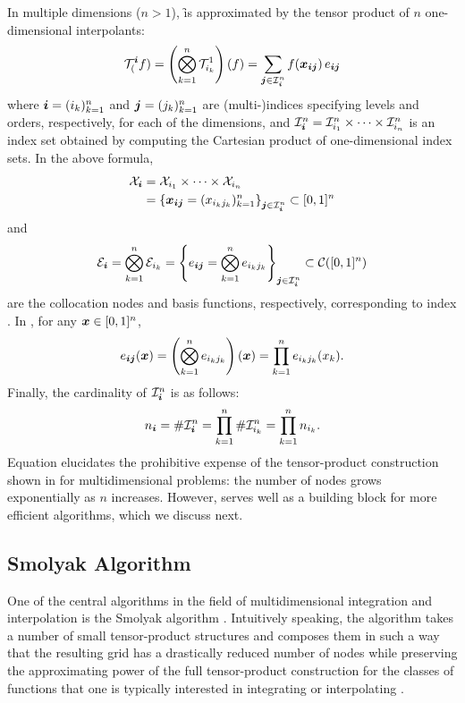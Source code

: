 In multiple dimensions ($n > 1$), \f is approximated by the tensor product of
$n$ one-dimensional interpolants:
\[
  \mathcal{T}^{\boldsymbol{i}}_{(}f)
  = \left( \bigotimes_{k = 1}^n \mathcal{T}^{1}_{i_k} \right)(f)
  = \sum_{\boldsymbol{j} \in \mathcal{I}^{n}_{\boldsymbol{i}}} f(\boldsymbol{x}_{\boldsymbol{i} \boldsymbol{j}}) \, e_{\boldsymbol{i} \boldsymbol{j}}
\]
where $\boldsymbol{i} = (i_k)_{k = 1}^n$ and $\boldsymbol{j} = (j_k)_{k = 1}^n$ are (multi-)indices
specifying levels and orders, respectively, for each of the dimensions, and
$\mathcal{I}^{n}_{\boldsymbol{i}} = \mathcal{I}^{n}_{i_1} \times \cdots \times
\mathcal{I}^{n}_{i_n}$ is an index set obtained by computing the Cartesian
product of one-dimensional index sets. In the above formula,
\begin{align*}
  \mathcal{X}_{\boldsymbol{i}} &= \mathcal{X}_{i_1} \times \cdots \times \mathcal{X}_{i_n} \\
           &= \left\{ \boldsymbol{x}_{\boldsymbol{i} \boldsymbol{j}} = (x_{i_k j_k})_{k = 1}^n \right\}_{\boldsymbol{j} \in \mathcal{I}^{n}_{\boldsymbol{i}}} \subset [0, 1]^n
\end{align*}
and
\[
  \mathcal{E}_{\boldsymbol{i}}
  = \bigotimes_{k = 1}^n \mathcal{E}_{i_k}
  = \left\{ e_{\boldsymbol{i} \boldsymbol{j}} = \bigotimes_{k = 1}^n e_{i_k j_k} \right\}_{\boldsymbol{j} \in \mathcal{I}^{n}_{\boldsymbol{i}}} \subset \mathcal{C}([0, 1]^n)
\]
are the collocation nodes and basis functions, respectively, corresponding to
index \vi. In , for any $\boldsymbol{x} \in [0, 1]^n$,
\[
  e_{\boldsymbol{i} \boldsymbol{j}}(\boldsymbol{x})
  = \left( \bigotimes_{k = 1}^n e_{i_k j_k} \right)(\boldsymbol{x})
  = \prod_{k = 1}^n e_{i_k j_k}(x_k).
\]
Finally, the cardinality of $\mathcal{I}^{n}_{\boldsymbol{i}}$ is as follows:
\[
  n_{\boldsymbol{i}}
  = \# \mathcal{I}^{n}_{\boldsymbol{i}}
  = \prod_{k = 1}^n \# \mathcal{I}^{n}_{i_k}
  = \prod_{k = 1}^n n_{i_k}.
\]
Equation  elucidates the prohibitive expense of the
tensor-product construction shown in  for multidimensional
problems: the number of nodes grows exponentially as $n$ increases. However,
 serves well as a building block for more efficient algorithms,
which we discuss next.

\subsection{Smolyak Algorithm}

One of the central algorithms in the field of multidimensional integration and
interpolation is the Smolyak algorithm \cite{smolyak1963}. Intuitively speaking,
the algorithm takes a number of small tensor-product structures and composes
them in such a way that the resulting grid has a drastically reduced number of
nodes while preserving the approximating power of the full tensor-product
construction for the classes of functions that one is typically interested in
integrating or interpolating \cite{klimke2006}.

